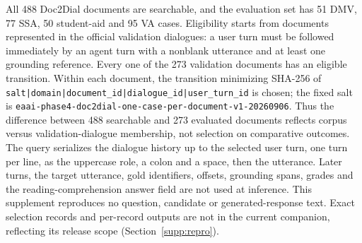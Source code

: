 All 488 Doc2Dial documents are searchable, and the evaluation set has 51 DMV, 77 SSA, 50 student-aid and 95 VA cases. Eligibility starts from documents represented in the official validation dialogues: a user turn must be followed immediately by an agent turn with a nonblank utterance and at least one grounding reference. Every one of the 273 validation documents has an eligible transition. Within each document, the transition minimizing SHA-256 of \texttt{salt|domain|document\_id|dialogue\_id|user\_turn\_id} is chosen; the fixed salt is \nolinkurl{eaai-phase4-doc2dial-one-case-per-document-v1-20260906}. Thus the difference between 488 searchable and 273 evaluated documents reflects corpus versus validation-dialogue membership, not selection on comparative outcomes. The query serializes the dialogue history up to the selected user turn, one turn per line, as the uppercase role, a colon and a space, then the utterance. Later turns, the target utterance, gold identifiers, offsets, grounding spans, grades and the reading-comprehension answer field are not used at inference. This supplement reproduces no question, candidate or generated-response text. Exact selection records and per-record outputs are not in the current companion, reflecting its release scope (Section~\ref{supp:repro}).

